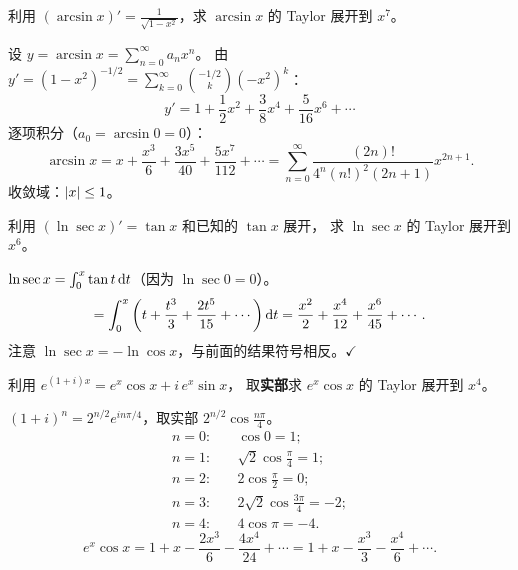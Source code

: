 \documentclass{ctexart}
\begin{document}
\begin{exercise}
  利用 $(\arcsin x)' = \frac{1}{\sqrt{1-x^2}}$，求 $\arcsin x$ 的 Taylor 展开到 $x^7$。
\end{exercise}

\begin{solution}
  设 $y = \arcsin x = \sum_{n=0}^\infty a_n x^n$。
  由 $y' = (1-x^2)^{-1/2} = \sum_{k=0}^\infty \binom{-1/2}{k}(-x^2)^k$：
  \[
    y' = 1 + \frac{1}{2}x^2 + \frac{3}{8}x^4 + \frac{5}{16}x^6 + \cdots
  \]
  逐项积分（$a_0 = \arcsin 0 = 0$）：
  \[
    \arcsin x = x + \frac{x^3}{6} + \frac{3x^5}{40} + \frac{5x^7}{112} + \cdots
    = \sum_{n=0}^\infty \frac{(2n)!}{4^n(n!)^2(2n+1)}x^{2n+1}.
  \]
  收敛域：$\left| x \right| \le 1$。
\end{solution}

\begin{exercise}
  利用 $(\ln\sec x)' = \tan x$ 和已知的 $\tan x$ 展开，
  求 $\ln\sec x$ 的 Taylor 展开到 $x^6$。
\end{exercise}

\begin{solution}
  $\ln\sec x = \int_0^x \tan t\,\mathrm{d} t$（因为 $\ln\sec 0 = 0$）。
  \[
    = \int_0^x\left(t + \frac{t^3}{3} + \frac{2t^5}{15} + \cdots\right)\mathrm{d} t
    = \frac{x^2}{2} + \frac{x^4}{12} + \frac{x^6}{45} + \cdots.
  \]
  注意 $\ln\sec x = -\ln\cos x$，与前面的结果符号相反。$\checkmark$
\end{solution}

\begin{exercise}
  利用 $e^{(1+i)x} = e^x\cos x + i\,e^x\sin x$，
  取\textbf{实部}求 $e^x\cos x$ 的 Taylor 展开到 $x^4$。
\end{exercise}

\begin{solution}
  $(1+i)^n = 2^{n/2}e^{in\pi/4}$，取实部 $2^{n/2}\cos\frac{n\pi}{4}$。
  \begin{align*}
    n=0:& \quad \cos 0 = 1; \\
    n=1:& \quad \sqrt{2}\cos\frac{\pi}{4} = 1; \\
    n=2:& \quad 2\cos\frac{\pi}{2} = 0; \\
    n=3:& \quad 2\sqrt{2}\cos\frac{3\pi}{4} = -2; \\
    n=4:& \quad 4\cos\pi = -4.
  \end{align*}
  \[
    e^x\cos x = 1 + x - \frac{2x^3}{6} - \frac{4x^4}{24} + \cdots
    = 1 + x - \frac{x^3}{3} - \frac{x^4}{6} + \cdots.
  \]
\end{solution}
\end{document}
